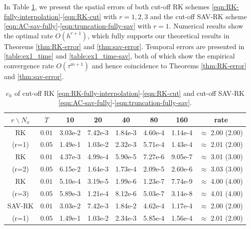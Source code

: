 \documentclass[a4paper, oneside]{book}
\begin{document}
In Table \ref{table:ex1_space}, we present the spatial errors of both
cut-off RK schemes \eqref{eqn:RK-fully-interpolation}-\eqref{eqn:RK-cut} with $r=1,2,3$ and the cut-off SAV-RK scheme
\eqref{eqn:AC-sav-fully}-\eqref{eqn:truncation-fully-sav}  with $r=1$.
Numerical results show the optimal rate $O(h^{r+1})$, which fully supports our theoretical results in
Theorems \ref{thm:RK-error} and \ref{thm:sav-error}.
Temporal errors are presented in \ref{table:ex1_time} and \ref{table:ex1_time-sav},
both of which show the empirical convergence rate $O(\tau^{m+1})$
and hence coincidence to Theorems \ref{thm:RK-error} and \ref{thm:sav-error}.



\begin{table}[h]
\centering
\caption{$e_h$ of cut-off RK  \eqref{eqn:RK-fully-interpolation}-\eqref{eqn:RK-cut}  and cut-off SAV-RK
\eqref{eqn:AC-sav-fully}-\eqref{eqn:truncation-fully-sav}. }
\begin{tabular}{|c|c|ccccc|c|}
\hline
$r\backslash N_x$  & $T$   &10 &20 &40 &80 &160&   rate \\
\hline
RK   &   $0.01$& 3.03e-2& 7.42e-3& 1.84e-3& 4.60e-4& 1.14e-4& $\approx$ 2.00 (2.00)    \\
 (r=1)   &   $0.05$& 1.49e-1& 1.03e-2& 2.32e-3& 5.71e-4& 1.43e-4& $\approx$ 2.01 (2.00)    \\
\hline
RK  &   $0.01$& 4.37e-3& 4.99e-4& 5.90e-5& 7.27e-6& 9.05e-7& $\approx$ 3.01 (3.00)    \\
(r=2)    &   $0.05$& 6.15e-2& 1.64e-3& 1.73e-4& 2.09e-5& 2.60e-6& $\approx$ 3.03 (3.00)    \\
\hline
RK   &   $0.01$& 5.10e-4& 3.19e-5& 1.99e-6& 1.23e-7& 7.74e-9&$\approx$ 4.00 (4.00)   \\
 (r=3)   &   $0.05$& 5.89e-3& 1.21e-4& 8.12e-6& 5.03e-7& 3.14e-8&$\approx$ 4.01 (4.00)    \\
\hline
SAV-RK &$0.01$& 3.03e-2& 7.42e-3& 1.84e-2& 4.62e-4& 1.17e-4& $\approx$ 2.00 (2.00)\\
(r=1)  &$0.05$& 1.49e-1& 1.03e-2& 2.34e-3& 5.85e-4& 1.56e-4& $\approx$ 2.01 (2.00)\\
\hline
\end{tabular}
\label{table:ex1_space}
\end{table}
\end{document}
